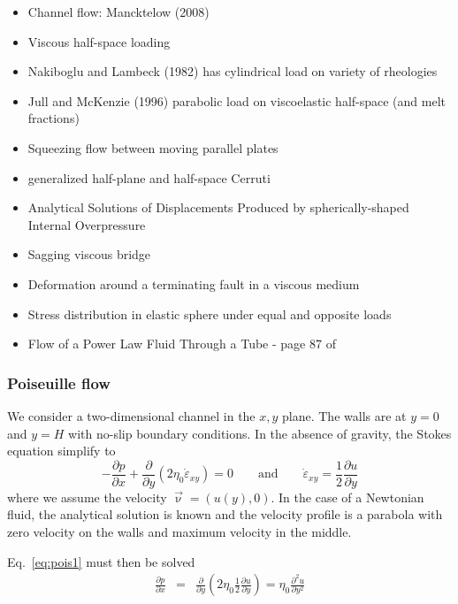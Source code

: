 \begin{itemize}
\item Channel flow: Mancktelow (2008) \cite{manc08}
\item Viscous half-space loading \cite{hask35}
\item Nakiboglu and Lambeck (1982) has cylindrical load on variety of rheologies \cite{nala82}
\item Jull and McKenzie (1996) \cite{jumc96} parabolic load on viscoelastic half-space (and melt fractions) 
\item Squeezing flow between moving parallel plates \cite{gugu77}
\item generalized half-plane and half-space Cerruti \cite{nowi92,zhga15}
\item Analytical Solutions of Displacements Produced by spherically-shaped Internal Overpressure \cite{gech12}
\item Sagging viscous bridge \cite{stokes98}
\item Deformation around a terminating fault in a viscous medium \cite{baho96}
\item Stress distribution in elastic sphere under equal and opposite loads \cite{stro52}
\item Flow of a Power Law Fluid Through a Tube - page 87 of \textcite{macosko}
\end{itemize}


\subsubsection{Poiseuille flow} \label{ss:poiseuille}

We consider a two-dimensional channel in the $x,y$ plane. The walls 
are at $y=0$ and $y=H$ with no-slip boundary conditions. 
In the absence of gravity, the Stokes equation simplify to 
\begin{equation}
-\frac{\partial p}{\partial x}  +\frac{\partial }{\partial y} (2\eta_0 \dot{\varepsilon}_{xy}) =0
\qquad
\text{and}
\qquad
\dot{\varepsilon}_{xy} = \frac{1}{2} \frac{\partial u}{\partial y} 
\label{eq:pois1}
\end{equation}
where we assume the velocity $\vec\upnu=(u(y),0)$.
In the case of a Newtonian fluid, the analytical solution is 
known and the velocity profile is a parabola with zero velocity on the
walls and maximum velocity in the middle. 


Eq.~\eqref{eq:pois1} must then be solved 
\begin{eqnarray}
\frac{\partial p}{\partial x}  
&=&\frac{\partial }{\partial y} \left(2\eta_{0}  \frac{1}{2}\frac{\partial u}{\partial y} \right) 
= \eta_0 \frac{\partial^2 u}{\partial y^2}  
\end{eqnarray}

